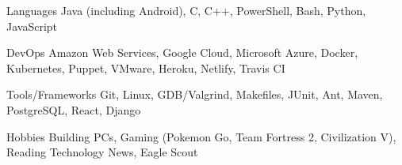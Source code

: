

\begin{cvskills}


  \cvskill
    {Languages} %
    {Java (including Android), C, C++, PowerShell, Bash, Python, JavaScript} %

  \cvskill
    {DevOps} %
    {Amazon Web Services, Google Cloud, Microsoft Azure, Docker, Kubernetes, Puppet, VMware, Heroku, Netlify, Travis CI} %
    
  \cvskill
    {Tools/Frameworks} %
    {Git, Linux, GDB/Valgrind, Makefiles, JUnit, Ant, Maven, PostgreSQL, React, Django} %

  \cvskill
  {Hobbies} %
  {Building PCs, Gaming (Pokemon Go, Team Fortress 2, Civilization V), Reading Technology News, Eagle Scout} %

\end{cvskills}
